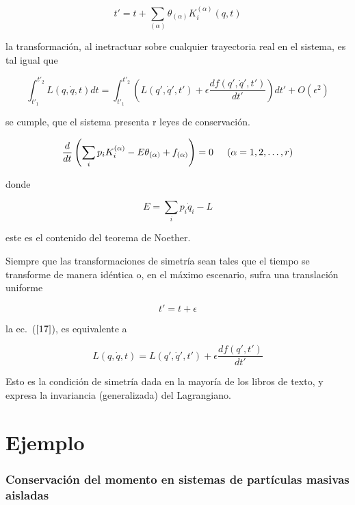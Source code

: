 \documentclass[a4paper,11pt]{article}
\begin{document}
\begin{equation}
     t'=t+\sum_{(\alpha)} \theta_{(\alpha)} K^{(\alpha)} _i (q,t)
\end{equation}

la transformación, al inetractuar sobre cualquier trayectoria real en el sistema, es tal igual que 

\begin{equation}
    \int_{t'_1}^{t'_2} L(q,\dot{q},t)dt =  \int_{t'_1}^{t'_2} \left( L (q',\dot{q}',t')+\epsilon \frac{df(q',\dot{q}',t')}{dt'}\right)dt' + O(\epsilon^2)
\end{equation}

se cumple, que el sistema presenta r leyes de conservación.

\begin{equation}
    \frac{d}{dt}\left(\sum_i p_i K^{(\alpha)}_i -E\theta_{(\alpha)} +f_{(\alpha)}  \right)=0 \hspace{0.5cm} (\alpha=1,2, \ldots, r )
\end{equation}

donde 

\begin{equation}
    E=\sum_i p_i \dot{q}_i - L
\end{equation}

este es el contenido del teorema de Noether.

 Siempre que las transformaciones de simetría sean tales que el tiempo se transforme de manera idéntica o, en el máximo escenario, sufra una translación uniforme

 \begin{equation}
    t'=t+\epsilon
\end{equation}

la ec.~(\(\ref{17}\)), es equivalente a 

\begin{equation}
    L(q,\dot{q},t)=L(q',\dot{q}',t') + \epsilon \frac{df(q',t')}{dt'}
\end{equation}


Esto es la condición de simetría dada en la mayoría de los libros de texto, y expresa la invariancia (generalizada) del Lagrangiano.
\section{Ejemplo}
\subsubsection{Conservación del momento en sistemas de partículas masivas aisladas}
\end{document}

